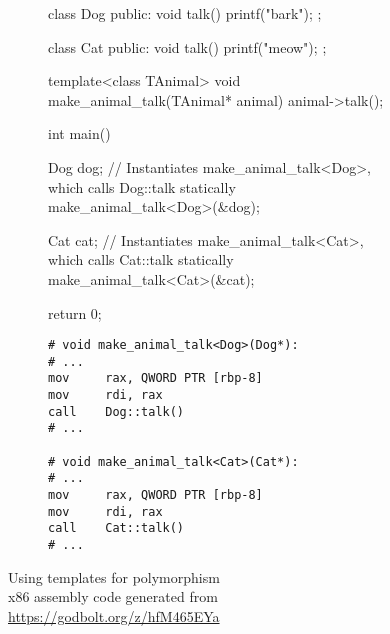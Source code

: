 \begin{figure}
    \centering
    \begin{subfigure}{0.49\linewidth}%
        \begin{cppcode}
class Dog {
public:
    void talk() {
        printf("bark\n");
    }
};

class Cat {
public:
    void talk() {
        printf("meow\n");
    }
};

template<class TAnimal>
void make_animal_talk(TAnimal* animal) {
    animal->talk();
}

int main() {
    Dog dog{};
    // Instantiates make_animal_talk<Dog>, which calls Dog::talk statically
    make_animal_talk<Dog>(&dog);

    Cat cat{};
    // Instantiates make_animal_talk<Cat>, which calls Cat::talk statically
    make_animal_talk<Cat>(&cat);

    return 0;
}
        \end{cppcode}
    \end{subfigure}%
    \begin{subfigure}{0.49\linewidth}%
        \begin{verbatim}
# void make_animal_talk<Dog>(Dog*):
# ...
mov     rax, QWORD PTR [rbp-8]
mov     rdi, rax
call    Dog::talk()
# ...
        
# void make_animal_talk<Cat>(Cat*):
# ...
mov     rax, QWORD PTR [rbp-8]
mov     rdi, rax
call    Cat::talk()
# ...
        \end{verbatim}
    \end{subfigure}%
    \caption{Using templates for polymorphism\\{x86 assembly code generated from \url{https://godbolt.org/z/hfM465EYa}}}%
    \label{fig:templated_polymorphism}%
\end{figure}
